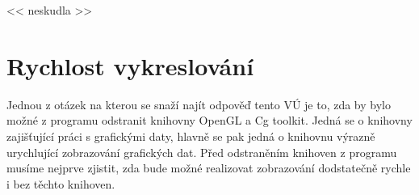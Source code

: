 << neskudla >>

\section{Rychlost vykreslování}
Jednou z otázek na kterou se snaží najít odpověď tento VÚ je to, zda by bylo možné z programu odstranit knihovny OpenGL a Cg toolkit. Jedná se o knihovny zajišťující práci s grafickými daty, hlavně se pak jedná o knihovnu výrazně urychlující zobrazování grafických dat. Před odstraněním knihoven z programu musíme nejprve zjistit, zda bude možné realizovat zobrazování dodstatečně rychle i bez těchto knihoven. 

